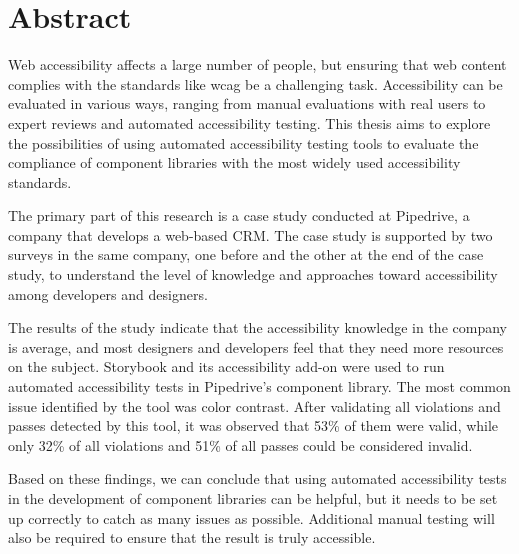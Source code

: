 \documentclass{master_thesis}
\begin{document}
\section*{Abstract}
\thispagestyle{empty}




Web accessibility affects a large number of people, but ensuring that web content complies with the standards like \ac{wcag} be a challenging task. Accessibility can be evaluated in various ways, ranging from manual evaluations with real users to expert reviews and automated accessibility testing. This thesis aims to explore the possibilities of using automated accessibility testing tools to evaluate the compliance of component libraries with the most widely used accessibility standards.


The primary part of this research is a case study conducted at Pipedrive, a company that develops a web-based CRM. The case study is supported by two surveys in the same company, one before and the other at the end of the case study, to understand the level of knowledge and approaches toward accessibility among developers and designers.

The results of the study indicate that the accessibility knowledge in the company is average, and most designers and developers feel that they need more resources on the subject. Storybook and its accessibility add-on were used to run automated accessibility tests in Pipedrive's component library. The most common issue identified by the tool was color contrast. After validating all violations and passes detected by this tool, it was observed that 53\% of them were valid, while only 32\% of all violations and 51\% of all passes could be considered invalid.


Based on these findings, we can conclude that using automated accessibility tests in the development of component libraries can be helpful, but it needs to be set up correctly to catch as many issues as possible. Additional manual testing will also be required to ensure that the result is truly accessible.
\end{document}
